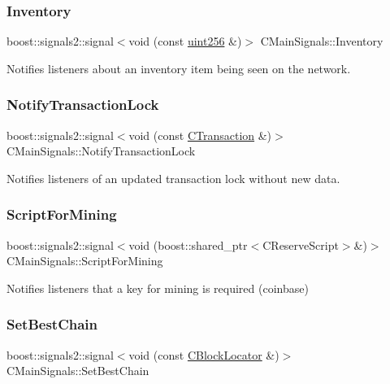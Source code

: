 \subsubsection{\texorpdfstring{Inventory}{Inventory}}
{\footnotesize\ttfamily boost\+::signals2\+::signal$<$void (const \mbox{\hyperlink{classuint256}{uint256}} \&)$>$ C\+Main\+Signals\+::\+Inventory}

Notifies listeners about an inventory item being seen on the network. \mbox{\label{struct_c_main_signals_a8323c4bfc6811c30abd2e3ff8aacbbaf}} 
\subsubsection{\texorpdfstring{NotifyTransactionLock}{NotifyTransactionLock}}
{\footnotesize\ttfamily boost\+::signals2\+::signal$<$void (const \mbox{\hyperlink{class_c_transaction}{C\+Transaction}} \&)$>$ C\+Main\+Signals\+::\+Notify\+Transaction\+Lock}

Notifies listeners of an updated transaction lock without new data. \mbox{\label{struct_c_main_signals_a459b58e6ee3b3c064439c665cfc8b28d}} 
\subsubsection{\texorpdfstring{ScriptForMining}{ScriptForMining}}
{\footnotesize\ttfamily boost\+::signals2\+::signal$<$void (boost\+::shared\+\_\+ptr$<$C\+Reserve\+Script$>$\&)$>$ C\+Main\+Signals\+::\+Script\+For\+Mining}

Notifies listeners that a key for mining is required (coinbase) \mbox{\label{struct_c_main_signals_a11f2f18522ff7aa672eb5cc8c1f397b2}} 
\subsubsection{\texorpdfstring{SetBestChain}{SetBestChain}}
{\footnotesize\ttfamily boost\+::signals2\+::signal$<$void (const \mbox{\hyperlink{struct_c_block_locator}{C\+Block\+Locator}} \&)$>$ C\+Main\+Signals\+::\+Set\+Best\+Chain}

